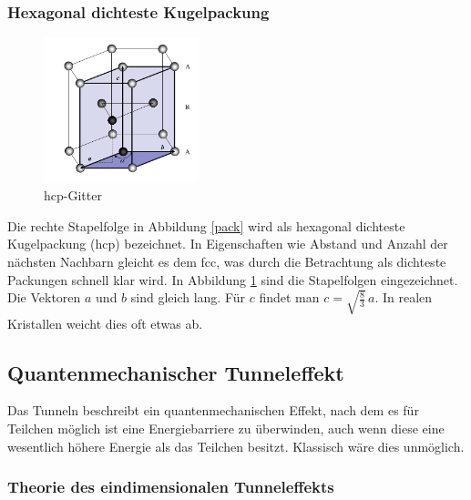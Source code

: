         \subsubsection{Hexagonal dichteste Kugelpackung}

\begin{figure}
    \centering
    \includegraphics[width=0.4\textwidth]{Abb/hcp.png}
    \caption{hcp-Gitter \cite{hunklinger}}
    \label{hcp}
\end{figure}
Die rechte Stapelfolge in Abbildung \ref{pack} wird als hexagonal dichteste
Kugelpackung (hcp) bezeichnet. In Eigenschaften wie Abstand und Anzahl der nächsten
Nachbarn gleicht es dem fcc, was durch die Betrachtung als dichteste Packungen 
schnell klar wird. In Abbildung \ref{hcp} sind die Stapelfolgen eingezeichnet.
Die Vektoren $a$ und $b$ sind gleich lang. Für $c$ findet man $c = \sqrt{ 
\frac{8}{3}} \, a$. In realen Kristallen weicht dies oft etwas ab.

     \subsection{Quantenmechanischer Tunneleffekt}

Das Tunneln beschreibt ein quantenmechanischen Effekt, nach dem es für Teilchen
möglich ist eine Energiebarriere zu überwinden, auch wenn diese eine wesentlich
höhere Energie als das Teilchen besitzt. Klassisch wäre dies unmöglich.

        \subsubsection{Theorie des eindimensionalen Tunneleffekts}

